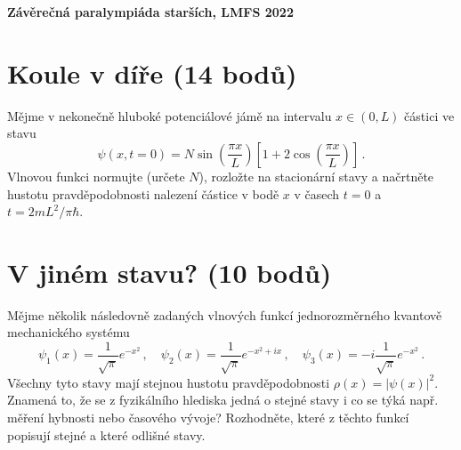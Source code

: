 \documentclass[10pt,a4paper,landscape]{article}
\author{Ondřej Zelenka}
\begin{document}
\pagestyle{empty}
\textbf{\LARGE Závěrečná paralympiáda starších, LMFS 2022}

\begin{multicols}{2}[]

\section{Koule v díře (14 bodů)}
Mějme v nekonečně hluboké potenciálové jámě na intervalu $x\in\left(0, L\right)$ částici ve stavu
\begin{equation}
\psi\left(x, t=0\right) = N\sin\left(\frac{\pi x}{L}\right)\left[1 + 2\cos\left(\frac{\pi x}{L}\right)\right] \,.
\end{equation}
Vlnovou funkci normujte (určete $N$), rozložte na stacionární stavy a načrtněte hustotu pravděpodobnosti nalezení částice v bodě $x$ v časech $t = 0$ a $t = 2mL^2/\pi\hbar$.

\section{V jiném stavu? (10 bodů)}
Mějme několik následovně zadaných vlnových funkcí jednorozměrného kvantově mechanického systému
\begin{equation}
\psi_1\left(x\right) = \frac{1}{\sqrt{\pi}}e^{-x^2} \,,\quad \psi_2\left(x\right) = \frac{1}{\sqrt{\pi}}e^{-x^2+ix} \,,\quad \psi_3\left(x\right) = -i\frac{1}{\sqrt{\pi}}e^{-x^2} \,.
\end{equation}
Všechny tyto stavy mají stejnou hustotu pravděpodobnosti $\rho\left(x\right) = \left|\psi\left(x\right)\right|^2$. Znamená to, že se z fyzikálního hlediska jedná o stejné stavy i co se týká např. měření hybnosti nebo časového vývoje? Rozhodněte, které z těchto funkcí popisují stejné a které odlišné stavy.


\end{multicols}
\end{document}
